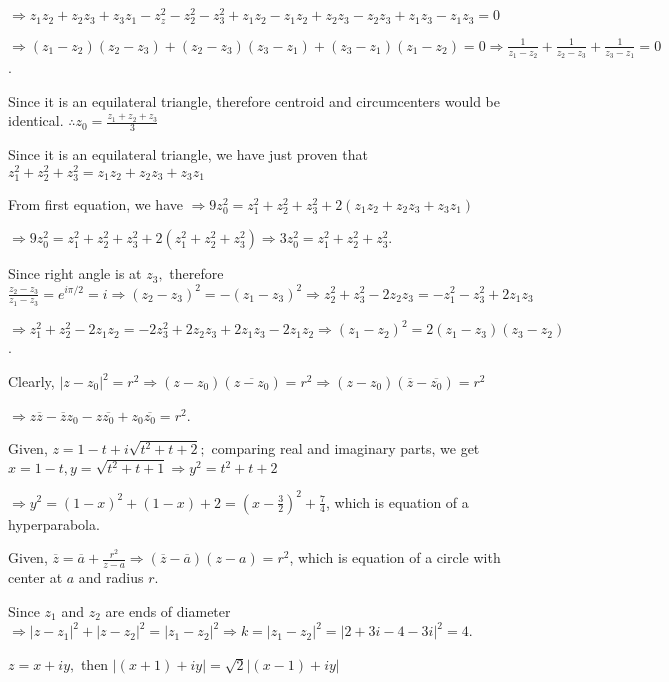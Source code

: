   $\Rightarrow z_1z_2 + z_2z_3 + z_3z_1 - z_z^2 - z_2^2 - z_3^2 + z_1z_2 - z_1z_2 + z_2z_3 - z_2z_3 + z_1z_3
  - z_1z_3 = 0$

  $\Rightarrow (z_1 - z_2)(z_2 - z_3) + (z_2 - z_3)(z_3 - z_1) + (z_3 - z_1)(z_1 - z_2) =
  0\Rightarrow \frac{1}{z_1 - z_2} + \frac{1}{z_2 - z_3} + \frac{1}{z_3 - z_1} = 0$.
\item Since it is an equilateral triangle, therefore centroid and circumcenters would be
  identical. $\therefore z_0 = \frac{z_1+ z_2 + z_3}{3}$

  Since it is an equilateral triangle, we have just proven that $z_1^2 + z_2^2 + z_3^2 = z_1z_2 + z_2z_3
  +z_3z_1$

  From first equation, we have $\Rightarrow 9z_0^2 = z_1^2 + z_2^2 + z_3^2 + 2(z_1z_2 + z_2z_3 +z_3z_1)$

  $\Rightarrow 9z_0^2 = z_1^2 + z_2^2 + z_3^2 + 2(z_1^2 + z_2^2 + z_3^2)\Rightarrow 3z_0^2 = z_1^2 + z_2^2 +
  z_3^2$.
\item Since right angle is at $z_3,$ therefore $\frac{z_2 - z_3}{z_1 - z_3} = e^{i\pi/2} = i\Rightarrow (z_2
  - z_3)^2 = -(z_1 - z_3)^2 \Rightarrow z_2^2 + z_3^2 - 2z_2z_3 = -z_1^2 - z_3^2 + 2z_1z_3$

  $\Rightarrow z_1^2 + z_2^2 - 2z_1z_2 = -2z_3^2 + 2z_2z_3 + 2z_1z_3 - 2z_1z_2\Rightarrow (z_1 - z_2)^2 =
  2(z_1 - z_3)(z_3 - z_2)$.
\item Clearly, $|z - z_0|^2 = r^2 \Rightarrow (z - z_0)(\overline{z - z_0}) = r^2\Rightarrow (z -
  z_0)(\overline{z} - \overline{z_0}) = r^2$

  $\Rightarrow z\overline{z} - \overline{z}z_0 - z\overline{z_0} + z_0\overline{z_0} = r^2$.
\item Given, $z = 1 - t + i\sqrt{t^2 + t + 2};$ comparing real and imaginary parts, we get $x = 1 - t, y =
  \sqrt{t^2 + t + 1} \Rightarrow y^2 = t^2 + t + 2$

  $\Rightarrow y^2 = (1 - x)^2 + (1 - x) + 2 = \left(x - \frac{3}{2}\right)^2 + \frac{7}{4}$, which is
  equation of a hyperparabola.
\item Given, $\overline{z} = \overline{a} + \frac{r^2}{z - a}\Rightarrow (\overline{z} - \overline{a})(z -
  a) = r^2$, which is equation of a circle with center at $a$ and radius $r.$
\item Since $z_1$ and $z_2$ are ends of diameter $\Rightarrow |z - z_1|^2 + |z - z_2|^2 = |z_1 -
  z_2|^2\Rightarrow k = |z_1 - z_2|^2 = |2 + 3i - 4 - 3i|^2 = 4$.
\item $z = x + iy,$ then $|(x + 1) + iy| = \sqrt{2}|(x - 1) + iy|$

